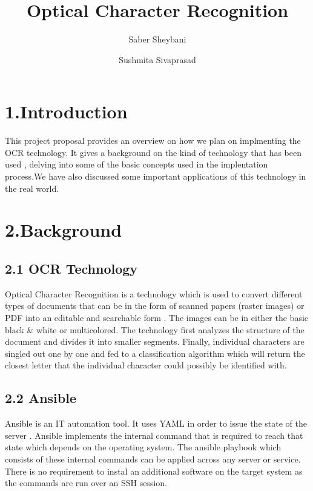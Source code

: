 \documentclass[9pt,twocolumn,twoside]{../../styles/osajnl}
\title{Optical Character Recognition}
\author[1]{Saber Sheybani}
\author[1]{Sushmita Sivaprasad}
\affil[1]{School of Informatics and Computing, Bloomington, IN 47408, U.S.A.}
\affil[*]{Corresponding authors: sheybani@umail.iu.edu,sushsiva@umail.iu.edu}
\begin{document}
\maketitle

\section{1.Introduction}

This project proposal provides an overview on how we plan on
implmenting the OCR technology. It gives a background on the kind of
technology that has been used , delving into some of the basic
concepts used in the implentation process.We have also discussed some
important applications of this technology in the real world.

\section{2.Background}
\subsection{2.1 OCR Technology}  
Optical Character Recognition is a technology which is used to convert
different types of documents that can be in the form of scanned papers
(raster images) or PDF into an editable and searchable form  \cite{www-ocr}. The
images can be in either the basic black \& white or multicolored.  The
technology first analyzes the structure of the document and divides it
into smaller segments. Finally, individual characters are singled out
one by one and fed to a classification algorithm which will return the
closest letter that the individual character could possibly be
identified with.

\subsection{2.2 Ansible} 
Ansible is an IT automation tool. It uses YAML in order to issue the
state of the server \cite{www-ocr}. Ansible implements the internal command that
is required to reach that state which depends on the operating
system. The ansible playbook which consists of these internal commands
can be applied across any server or service. There is no requirement
to instal an additional software on the target system as the commands
are run over an SSH session.
\end{document}
